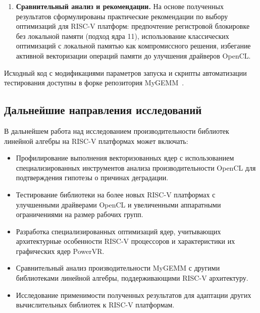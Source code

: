 \begin{enumerate}
    \item \textbf{Сравнительный анализ и рекомендации.} На основе полученных результатов сформулированы практические рекомендации по выбору оптимизаций для RISC-V платформ: предпочтение регистровой блокировке без локальной памяти (подход ядра 11), использование классических оптимизаций с локальной памятью как компромиссного решения, избегание активной векторизации операций памяти до улучшения драйверов OpenCL.
\end{enumerate}

Исходный код с модификациями параметров запуска и скрипты автоматизации тестирования доступны в форке репозитория MyGEMM~\cite{mygemm_repo_test}.

\subsection*{Дальнейшие направления исследований}

В дальнейшем работа над исследованием производительности библиотек линейной алгебры на RISC-V платформах может включать:

\begin{itemize}
    \item Профилирование выполнения векторизованных ядер с использованием специализированных инструментов анализа производительности OpenCL для подтверждения гипотезы о причинах деградации.
    
    \item Тестирование библиотеки на более новых RISC-V платформах с улучшенными драйверами OpenCL и увеличенными аппаратными ограничениями на размер рабочих групп.
    
    \item Разработка специализированных оптимизаций ядер, учитывающих архитектурные особенности RISC-V процессоров и характеристики их графических ядер PowerVR.
    
    \item Сравнительный анализ производительности MyGEMM с другими библиотеками линейной алгебры, поддерживающими RISC-V архитектуру.
    
    \item Исследование применимости полученных результатов для адаптации других вычислительных библиотек к RISC-V платформам.
\end{itemize}